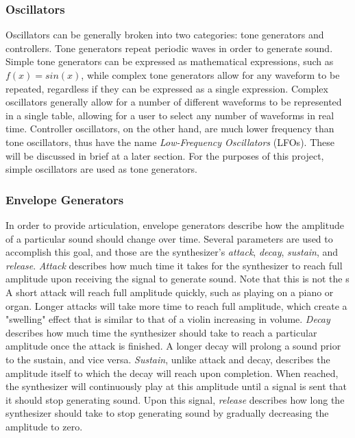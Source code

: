 \documentclass[12pt]{article}
\begin{document}
\subsubsection{Oscillators}
Oscillators can be generally broken into two categories: tone generators and controllers. Tone generators repeat periodic waves in order to generate sound. Simple tone generators can be expressed as mathematical expressions, such as \(f(x) = sin(x)\), while complex tone generators allow for any waveform to be repeated, regardless if they can be expressed as a single expression. Complex oscillators generally allow for a number of different waveforms to be represented in a single table, allowing for a user to select any number of waveforms in real time. Controller oscillators, on the other hand, are much lower frequency than tone oscillators, thus have the name \textit{Low-Frequency Oscillators} (LFOs). These will be discussed in brief at a later section. For the purposes of this project, simple oscillators are used as tone generators.

\subsubsection{Envelope Generators}
In order to provide articulation, envelope generators describe how the amplitude of a particular sound should change over time. Several parameters are used to accomplish this goal, and those are the synthesizer's \textit{attack}, \textit{decay}, \textit{sustain}, and \textit{release}. \textit{Attack} describes how much time it takes for the synthesizer to reach full amplitude upon receiving the signal to generate sound. Note that this is not the s A short attack will reach full amplitude quickly, such as playing on a piano or organ. Longer attacks will take more time to reach full amplitude, which create a "swelling" effect that is similar to that of a violin increasing in volume. \textit{Decay} describes how much time the synthesizer should take to reach a particular amplitude once the attack is finished. A longer decay will prolong a sound prior to the sustain, and vice versa. \textit{Sustain}, unlike attack and decay, describes the amplitude itself to which the decay will reach upon completion. When reached, the synthesizer will continuously play at this amplitude until a signal is sent that it should stop generating sound. Upon this signal, \textit{release} describes how long the synthesizer should take to stop generating sound by gradually decreasing the amplitude to zero. 
\end{document}
